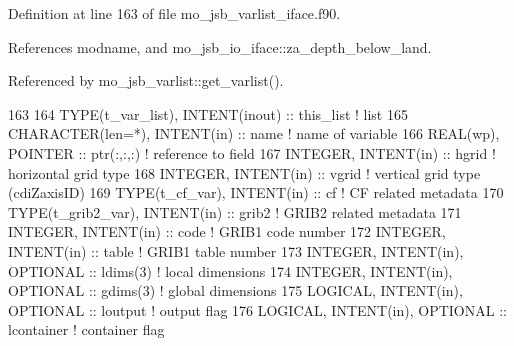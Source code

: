 Definition at line 163 of file mo\+\_\+jsb\+\_\+varlist\+\_\+iface.\+f90.



References modname, and mo\+\_\+jsb\+\_\+io\+\_\+iface\+::za\+\_\+depth\+\_\+below\+\_\+land.



Referenced by mo\+\_\+jsb\+\_\+varlist\+::get\+\_\+varlist().


\begin{DoxyCode}
163 
164     \textcolor{keywordtype}{TYPE}(t\_var\_list),     \textcolor{keywordtype}{INTENT(inout)}        :: this\_list           \textcolor{comment}{! list}
165     \textcolor{keywordtype}{CHARACTER(len=*)},     \textcolor{keywordtype}{INTENT(in)}           :: name                \textcolor{comment}{! name of variable}
166     \textcolor{keywordtype}{REAL(wp)},             \textcolor{keywordtype}{POINTER}              :: ptr(:,:,:)          \textcolor{comment}{! reference to field}
167     \textcolor{keywordtype}{INTEGER},              \textcolor{keywordtype}{INTENT(in)}           :: hgrid               \textcolor{comment}{! horizontal grid type}
168     \textcolor{keywordtype}{INTEGER},              \textcolor{keywordtype}{INTENT(in)}           :: vgrid               \textcolor{comment}{! vertical grid type (cdiZaxisID)}
169     \textcolor{keywordtype}{TYPE}(t\_cf\_var),       \textcolor{keywordtype}{INTENT(in)}           :: cf                  \textcolor{comment}{! CF related metadata}
170     \textcolor{keywordtype}{TYPE}(t\_grib2\_var),    \textcolor{keywordtype}{INTENT(in)}           :: grib2               \textcolor{comment}{! GRIB2 related metadata}
171     \textcolor{keywordtype}{INTEGER},              \textcolor{keywordtype}{INTENT(in)}           :: code                \textcolor{comment}{! GRIB1 code number}
172     \textcolor{keywordtype}{INTEGER},              \textcolor{keywordtype}{INTENT(in)}           :: table               \textcolor{comment}{! GRIB1 table number}
173     \textcolor{keywordtype}{INTEGER},              \textcolor{keywordtype}{INTENT(in)}, \textcolor{keywordtype}{OPTIONAL} :: ldims(3)            \textcolor{comment}{! local dimensions}
174     \textcolor{keywordtype}{INTEGER},              \textcolor{keywordtype}{INTENT(in)}, \textcolor{keywordtype}{OPTIONAL} :: gdims(3)            \textcolor{comment}{! global dimensions}
175     \textcolor{keywordtype}{LOGICAL},              \textcolor{keywordtype}{INTENT(in)}, \textcolor{keywordtype}{OPTIONAL} :: loutput             \textcolor{comment}{! output flag}
176     \textcolor{keywordtype}{LOGICAL},              \textcolor{keywordtype}{INTENT(in)}, \textcolor{keywordtype}{OPTIONAL} :: lcontainer          \textcolor{comment}{! container flag}

\end{DoxyCode}
